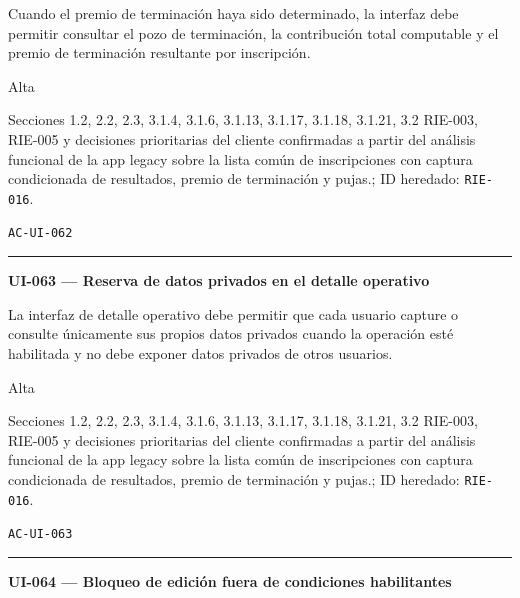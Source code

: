 \documentclass[10pt,letterpaper]{article}
\begin{document}
\begin{description}[style=nextline,leftmargin=3.15cm,labelwidth=2.8cm,font=\normalfont\bfseries]
\item[Obligación] Cuando el premio de terminación haya sido determinado, la interfaz debe permitir consultar el pozo de terminación, la contribución total computable y el premio de terminación resultante por inscripción.
\item[Prioridad] Alta
\item[Procedencia] Secciones 1.2, 2.2, 2.3, 3.1.4, 3.1.6, 3.1.13, 3.1.17, 3.1.18, 3.1.21, 3.2 RIE-003, RIE-005 y decisiones prioritarias del cliente confirmadas a partir del análisis funcional de la app legacy sobre la lista común de inscripciones con captura condicionada de resultados, premio de terminación y pujas.; ID heredado: \texttt{RIE-016}.
\item[Verificación] \texttt{AC-UI-062}
\end{description}
\vspace{0.25em}\hrule\vspace{0.65em}
\noindent\textbf{UI-063 --- Reserva de datos privados en el detalle operativo}\par
\begin{description}[style=nextline,leftmargin=3.15cm,labelwidth=2.8cm,font=\normalfont\bfseries]
\item[Obligación] La interfaz de detalle operativo debe permitir que cada usuario capture o consulte únicamente sus propios datos privados cuando la operación esté habilitada y no debe exponer datos privados de otros usuarios.
\item[Prioridad] Alta
\item[Procedencia] Secciones 1.2, 2.2, 2.3, 3.1.4, 3.1.6, 3.1.13, 3.1.17, 3.1.18, 3.1.21, 3.2 RIE-003, RIE-005 y decisiones prioritarias del cliente confirmadas a partir del análisis funcional de la app legacy sobre la lista común de inscripciones con captura condicionada de resultados, premio de terminación y pujas.; ID heredado: \texttt{RIE-016}.
\item[Verificación] \texttt{AC-UI-063}
\end{description}
\vspace{0.25em}\hrule\vspace{0.65em}
\noindent\textbf{UI-064 --- Bloqueo de edición fuera de condiciones habilitantes}\par
\end{document}
